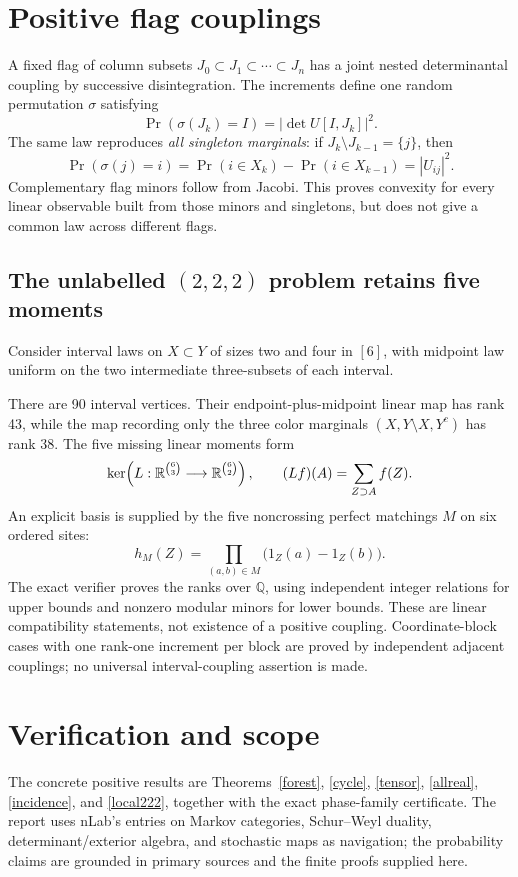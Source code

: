 \documentclass[11pt]{article}
\begin{document}
\section{Positive flag couplings}
A fixed flag of column subsets $J_0\subset J_1\subset\cdots\subset J_n$ has a joint nested determinantal coupling by successive disintegration. The increments define one random permutation $\sigma$ satisfying
\[
\Pr(\sigma(J_k)=I)=|\det U[I,J_k]|^2.
\]
The same law reproduces \emph{all singleton marginals}: if $J_k\setminus J_{k-1}=\{j\}$, then
\[
\Pr(\sigma(j)=i)
 =\Pr(i\in X_k)-\Pr(i\in X_{k-1})=|U_{ij}|^2.
\]
Complementary flag minors follow from Jacobi. This proves convexity for every linear observable built from those minors and singletons, but does not give a common law across different flags.


\subsection{The unlabelled $(2,2,2)$ problem retains five moments}
Consider interval laws on $X\subset Y$ of sizes two and four in $[6]$, with midpoint law uniform on the two intermediate three-subsets of each interval.

There are 90 interval vertices. Their endpoint-plus-midpoint linear map has rank 43, while the map recording only the three color marginals $(X,Y\setminus X,Y^c)$ has rank 38. The five missing linear moments form
\[
\ker\!\left(L:\mathbb R^{\binom63}\longrightarrow\mathbb R^{\binom62}\right),\qquad
(Lf)(A)=\sum_{Z\supset A}f(Z).
\]
An explicit basis is supplied by the five noncrossing perfect matchings $M$ on six ordered sites:
\[
h_M(Z)=\prod_{(a,b)\in M}\bigl(1_Z(a)-1_Z(b)\bigr).
\]
The exact verifier proves the ranks over $\mathbb Q$, using independent integer relations for upper bounds and nonzero modular minors for lower bounds. These are linear compatibility statements, not existence of a positive coupling. Coordinate-block cases with one rank-one increment per block are proved by independent adjacent couplings; no universal interval-coupling assertion is made.



\section{Verification and scope}
The concrete positive results are Theorems~\ref{forest}, \ref{cycle}, \ref{tensor}, \ref{allreal}, \ref{incidence}, and \ref{local222}, together with the exact phase-family certificate. The report uses nLab's entries on Markov categories, Schur--Weyl duality, determinant/exterior algebra, and stochastic maps as navigation; the probability claims are grounded in primary sources and the finite proofs supplied here.
\end{document}
